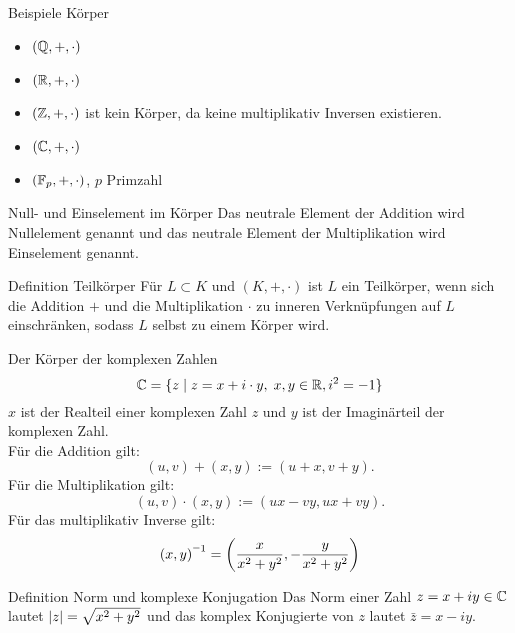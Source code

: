 \documentclass[main.tex]{subfiles}
\begin{document}
\begin{karte}{Beispiele Körper}
    \begin{itemize}
        \item \( (\mathbb{Q}, +, \cdot) \)
        \item \( (\mathbb{R}, +, \cdot) \)
        \item \( (\mathbb{Z}, +, \cdot) \) ist kein Körper, da keine 
        multiplikativ Inversen existieren.
        \item \( (\mathbb{C}, +, \cdot) \)
        \item \( (\mathbb{F}_p, +, \cdot) \), \(p\) Primzahl
    \end{itemize}
\end{karte}
\begin{karte}{Null- und Einselement im Körper}
    Das neutrale Element der Addition wird Nullelement genannt und 
    das neutrale Element der Multiplikation wird Einselement genannt.
\end{karte}
\begin{karte}{Definition Teilkörper}
    Für \( L \subset K \) und \( (K,+,\cdot) \) ist \(L\) 
    ein Teilkörper, wenn sich die Addition \(+\) und die 
    Multiplikation \( \cdot \) zu inneren Verknüpfungen 
    auf \(L\) einschränken, sodass \(L\) selbst zu einem 
    Körper wird.
\end{karte}
\begin{karte}{Der Körper der komplexen Zahlen}
    \[ \mathbb{C} = \{ z \;\vert \; z = x + i \cdot y, \; x, 
    y \in \mathbb{R}, i^2 = -1 \} \]
    \( x \) ist der Realteil einer komplexen Zahl \(z\) und 
    \( y \) ist der Imaginärteil der komplexen Zahl.\\
    Für die Addition gilt:
    \[ (u,v) + (x,y) := (u + x, v + y). \]
    Für die Multiplikation gilt: 
    \[ (u,v) \cdot (x,y) := (ux-vy, ux+vy). \]
    Für das multiplikativ Inverse gilt:
    \[ \inverse{(x,y)} = \left( \frac{x}{x^2 + y^2}, 
    -\frac{y}{ x^2 + y^2 } \right) \]
\end{karte}
\begin{karte}{Definition Norm und komplexe Konjugation}
    Das Norm einer Zahl \( z=x+iy \in \mathbb{C} \) lautet 
    \( \left| z \right| = \sqrt{x^2+y^2} \) und das komplex 
    Konjugierte von \(z\) lautet \( \bar{z} = x - iy \).
\end{karte}
\end{document}
